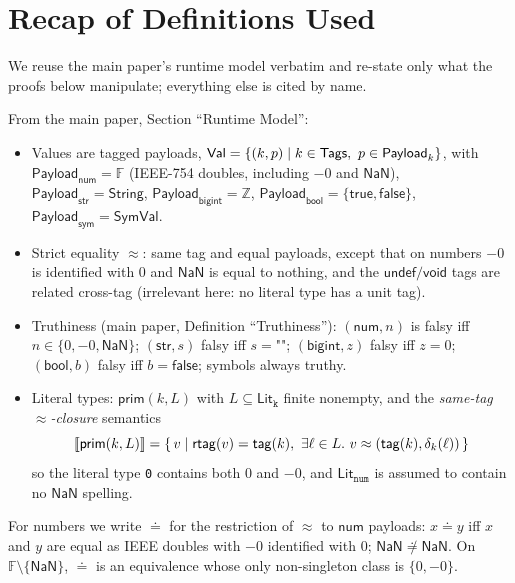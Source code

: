 \documentclass[11pt]{article}
\newcommand{\Payload}{\mathsf{Payload}}
\newcommand{\String}{\mathsf{String}}
\newcommand{\SymVal}{\mathsf{SymVal}}
\newcommand{\tagfn}{\mathsf{tag}}
\newcommand{\rtag}{\mathsf{rtag}}
\newcommand{\Lit}[1]{\mathsf{Lit}_{\texttt{#1}}}
\newcommand{\Fdb}{\mathbb{F}}
\newcommand{\zeq}{\doteq}   %
\begin{document}
\section{Recap of Definitions Used}
\label{sec:recap}

We reuse the main paper's runtime model verbatim and re-state only what the
proofs below manipulate; everything else is cited by name.

\begin{keydef}
From the main paper, Section ``Runtime Model'':
\begin{itemize}
\item Values are tagged payloads,
  $\Val = \{(k,p) \mid k \in \mathsf{Tags},\ p \in \Payload_k\}$, with
  $\Payload_{\mathsf{num}} = \Fdb$ (IEEE-754 doubles, including $-0$ and
  $\mathsf{NaN}$), $\Payload_{\mathsf{str}} = \String$,
  $\Payload_{\mathsf{bigint}} = \mathbb{Z}$,
  $\Payload_{\mathsf{bool}} = \{\mathsf{true},\mathsf{false}\}$,
  $\Payload_{\mathsf{sym}} = \SymVal$.
\item Strict equality $\approx$: same tag and equal payloads, except that
  on numbers $-0$ is identified with $0$ and $\mathsf{NaN}$ is equal to
  nothing, and the $\mathsf{undef}/\mathsf{void}$ tags are related
  cross-tag (irrelevant here: no literal type has a unit tag).
\item Truthiness (main paper, Definition ``Truthiness''):
  $(\mathsf{num}, n)$ is falsy iff $n \in \{0, -0, \mathsf{NaN}\}$;
  $(\mathsf{str}, s)$ falsy iff $s = \texttt{""}$;
  $(\mathsf{bigint}, z)$ falsy iff $z = 0$;
  $(\mathsf{bool}, b)$ falsy iff $b = \mathsf{false}$;
  symbols always truthy.
\item Literal types: $\mathsf{prim}(k, L)$ with
  $L \subseteq \Lit{k}$ finite nonempty, and the \emph{same-tag
  $\approx$-closure} semantics
  \[
  \sem{\mathsf{prim}(k, L)} =
  \{\, v \mid \rtag(v) = \tagfn(k),\
     \exists \ell \in L.\ v \approx (\tagfn(k), \delta_k(\ell)) \,\}
  \]
  so the literal type \texttt{0} contains both $0$ and $-0$, and
  $\Lit{num}$ is assumed to contain no $\mathsf{NaN}$ spelling.
\end{itemize}
\end{keydef}

For numbers we write $\zeq$ for the restriction of $\approx$ to
$\mathsf{num}$ payloads: $x \zeq y$ iff $x$ and $y$ are equal as IEEE
doubles with $-0$ identified with $0$; $\mathsf{NaN} \not\zeq
\mathsf{NaN}$. On $\Fdb \setminus \{\mathsf{NaN}\}$, $\zeq$ is an
equivalence whose only non-singleton class is $\{0, -0\}$.
\end{document}
